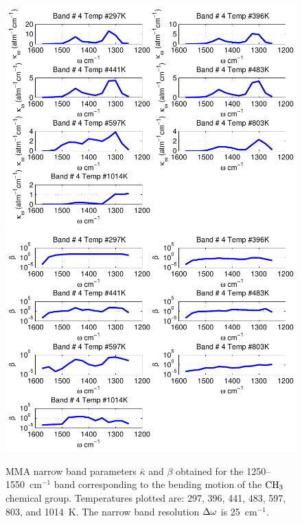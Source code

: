 \begin{figure}[p]
\begin{center}
\includegraphics[width=5.0in]{Figures/MMA_Kappa_Band4_MALKMUS.pdf}
\includegraphics[width=5.0in]{Figures/MMA_Beta_Band4_MALKMUS.pdf}
\end{center}
\caption{MMA narrow band parameters $\bar{\kappa}$ and $\beta$ obtained for the 1250--1550~cm$^{-1}$ band corresponding to the bending motion of the $\rm CH_3$ chemical group. Temperatures plotted are: 297, 396, 441, 483, 597, 803, and 1014~K. The narrow band resolution $\Delta \omega$ is 25~cm$^{-1}$.\label{fig:MMA_kappa_beta4}}
\end{figure}

